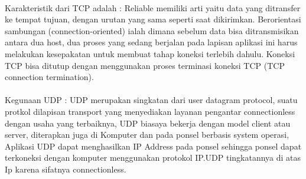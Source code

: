 \documentclass[12pt,a4paper]{article}
\begin{document}
\paragraph{}
\hspace{1cm}
Karakteristik dari TCP adalah :
Reliable memiliki arti yaitu data yang ditransfer ke tempat tujuan,  dengan urutan yang sama seperti saat dikirimkan.
Berorientasi sambungan (connection-oriented) ialah dimana sebelum data bisa ditransmisikan antara dua host, dua proses yang sedang berjalan pada lapisan aplikasi ini harus melakukan kesepakatan untuk membuat tahap koneksi terlebih dahulu. Koneksi TCP bisa ditutup dengan menggunakan proses terminasi koneksi TCP (TCP connection termination).

\paragraph{}
\hspace{1cm}
Kegunaan UDP : UDP merupakan singkatan dari user datagram protocol, suatu protkol dilapisan transport yang menyediakan  layanan pengantar connectionless dengan usaha yang terbaiknya, UDP biasaya bekerja dengan model client atau server, diterapkan juga di Komputer dan pada ponsel berbasis system operasi, Aplikasi UDP dapat menghasilkan IP Address pada ponsel sehingga ponsel dapat terkoneksi dengan komputer menggunakan protokol IP.UDP tingkatannya di atas Ip karena sifatnya connectionless.
\end{document}
